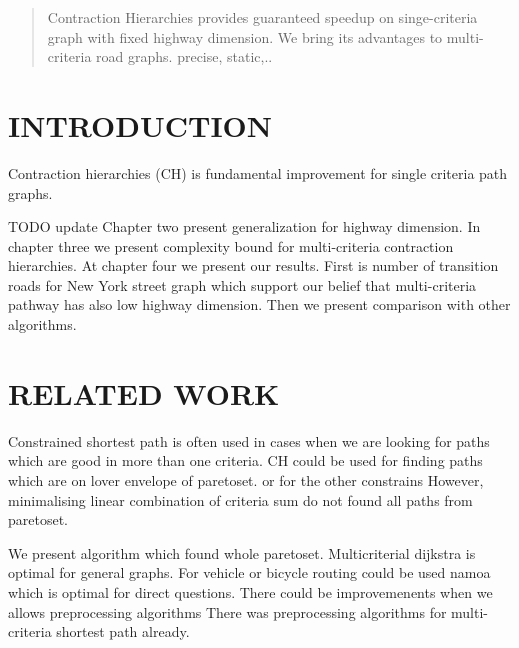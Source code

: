 
\begin{abstract}

Contraction Hierarchies provides guaranteed speedup on singe-criteria graph
with fixed highway dimension. We bring its advantages to multi-criteria 
road graphs.
precise, static,..


\end{abstract}

\section{INTRODUCTION}

Contraction hierarchies (CH) \cite{geisberger2008contraction}
is fundamental improvement for single criteria path graphs.


TODO update 
Chapter two present generalization for highway dimension. In chapter
three we present complexity bound for multi-criteria contraction hierarchies.
At chapter four we present our results. First is number of transition roads for
New York street graph which support our belief that multi-criteria pathway
has also low highway dimension.
Then we present comparison with other algorithms.



\section{RELATED WORK}

Constrained shortest path 
\cite{pugliese2013survey} is often used in cases when we are looking for
paths which are good in more than one criteria.
CH could be used for finding 
paths which are on lover envelope of paretoset.
\cite{funke2013polynomial}
or for the other constrains 
However, minimalising linear combination of criteria sum 
do not found all paths from paretoset.

We present algorithm which found whole paretoset.
Multicriterial dijkstra is optimal for general graphs.
For vehicle or bicycle routing could be used namoa
which is optimal for direct questions.
There could be improvemenents when we allows preprocessing
algorithms 
There was preprocessing algorithms for multi-criteria
shortest path already.
\cite{kohler2005acceleration} 

